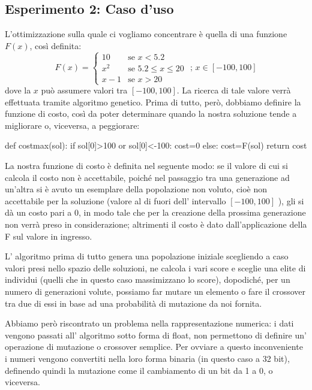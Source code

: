 		\subsection{Esperimento 2: Caso d'uso}
			L'ottimizzazione sulla quale ci vogliamo concentrare è quella di una funzione $F(x)$, così definita:
			\[
				F(x)=
				\begin{cases}
					10 & \mbox{se }x<5.2\\
					x^2 & \mbox{se }5.2\leq x \leq 20\\
					x-1 & \mbox{se } x>20
				\end{cases}
				\mbox{ ; }x \in [-100,100]
			\]
			dove la $x$ può assumere valori tra $[-100,100]$. La ricerca di tale valore verrà effettuata tramite algoritmo genetico. Prima di tutto, però, dobbiamo definire la funzione di costo, così da poter determinare quando la nostra soluzione tende a migliorare o, viceversa, a peggiorare:
			\bigskip
			\begin{python}
		def costmax(sol):
			if sol[0]>100 or sol[0]<-100:
				cost=0
			else:
				cost=F(sol)
		return cost  
			\end{python}
			\bigskip
			La nostra funzione di costo è definita nel seguente modo: se il valore di cui si calcola il costo non è accettabile, poiché nel passaggio tra una generazione ad un'altra si è avuto un esemplare della popolazione non voluto, cioè non accettabile per la soluzione (valore al di fuori dell' intervallo $[-100,100]$ ), gli si dà un costo pari a 0, in modo tale che per la creazione della prossima generazione non verrà preso in considerazione; altrimenti il costo è dato dall'applicazione della F sul valore in ingresso.\par
			L' algoritmo prima di tutto genera una popolazione iniziale scegliendo a caso valori presi nello spazio delle soluzioni, ne calcola i vari score e sceglie una elite di individui (quelli che in questo caso massimizzano lo score), dopodiché, per un numero di generazioni volute, possiamo far mutare un elemento o fare il crossover tra due di essi in base ad una probabilità di mutazione da noi fornita. \par 
			Abbiamo però riscontrato un problema nella rappresentazione numerica: i dati vengono passati all' algoritmo sotto forma di float, non permettono di definire un' operazione di mutazione o crossover semplice. Per ovviare a questo inconveniente i numeri vengono convertiti nella loro forma binaria (in questo caso a 32 bit), definendo quindi la mutazione come il cambiamento di un bit da 1 a 0, o viceversa.\par
